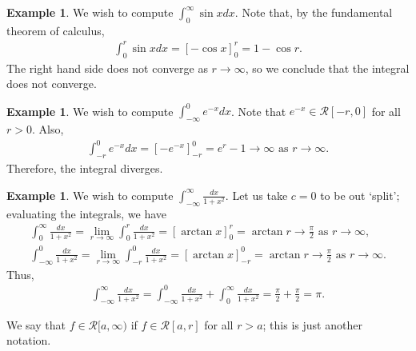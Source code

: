 \documentclass[15pt,a4paper]{book}
\theoremstyle{definition}
\newtheorem{example}[theorem]{Example}
\newcommand{\cR}{\mathcal{R}}
\begin{document}
\begin{example}
    We wish to compute $\int_{0}^{\infty} \sin x dx$. Note that, by the fundamental theorem of calculus,
    \begin{align}
        \int_{0}^{r} \sin x dx = [-\cos x]_{0}^{r} = 1 - \cos r.
    \end{align}
    The right hand side does not converge as $r \to \infty$, so we conclude that the integral does not converge.
\end{example}
\begin{example}
    We wish to compute $\int_{-\infty}^{0} e^{-x} dx$. Note that $e^{-x} \in \cR[-r,0]$ for all $r > 0$. Also,
    \begin{align}
        \int_{-r}^{0} e^{-x} dx = [-e^{-x}]_{-r}^{0} = e^{r}-1 \to \infty \text{ as } r \to \infty.
    \end{align}
    Therefore, the integral diverges.
\end{example}
\begin{example}
    We wish to compute $\int_{-\infty}^{\infty} \frac{dx}{1+x^{2}}$. Let us take $c = 0$ to be out `split'; evaluating the integrals, we have
    \begin{align}
        \int_{0}^{\infty} \frac{dx}{1+x^{2}} = \lim_{r \to \infty} \int_{0}^{r} \frac{dx}{1+x^{2}} = \left[ \arctan x \right]_{0}^{r} = \arctan r \to \frac{\pi}{2} \text{ as } r \to \infty,\\
        \int_{-\infty}^{0} \frac{dx}{1+x^{2}} = \lim_{r \to \infty} \int_{-r}^{0} \frac{dx}{1+x^{2}} = \left[ \arctan x \right]_{-r}^{0} = \arctan r \to \frac{\pi}{2} \text{ as } r \to \infty.
    \end{align}
    Thus,
    \begin{align}
        \int_{-\infty}^{\infty} \frac{dx}{1+x^{2}} = \int_{-\infty}^{0} \frac{dx}{1+x^{2}} + \int_{0}^{\infty} \frac{dx}{1+x^{2}} = \frac{\pi}{2} + \frac{\pi}{2} = \pi.
    \end{align}
\end{example}
We say that $f \in \cR[a,\infty)$ if $f \in \cR[a,r]$ for all $r > a$; this is just another notation.
\end{document}
